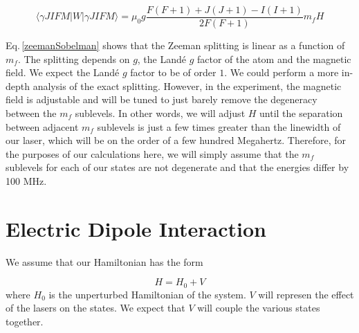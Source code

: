 \begin{equation} \label{zeemanSobelman}
\langle{\gamma JIFM|W|\gamma JIFM\rangle = \mu_0 g \frac{F(F+1)+J(J+1)-I(I+1)}{2F(F+1)}m_f H}
\end{equation}

Eq.\,\ref{zeemanSobelman} shows that the Zeeman splitting is linear as a function of $m_f$. The splitting depends on $g$, the Land\'e $g$ factor of the atom and the magnetic field. We expect the Land\'e $g$ factor to be of order $1$. We could perform a more in-depth analysis of the exact splitting. However, in the experiment, the magnetic field is adjustable and will be tuned to just barely remove the degeneracy between the $m_f$ sublevels. In other words, we will adjust $H$ until the separation between adjacent $m_f$ sublevels is just a few times greater than the linewidth of our laser, which will be on the order of a few hundred Megahertz. Therefore, for the purposes of our calculations here, we will simply assume that the $m_f$ sublevels for each of our states are not degenerate and that the energies differ by 100 MHz.

%







\section{Electric Dipole Interaction}

We assume that our Hamiltonian has the form 

\begin{equation}
H=H_0+V
\end{equation}
where $H_0$ is the unperturbed Hamiltonian of the system. $V$ will represen the effect of the lasers on the states. We expect that $V$ will couple the various states together. 

